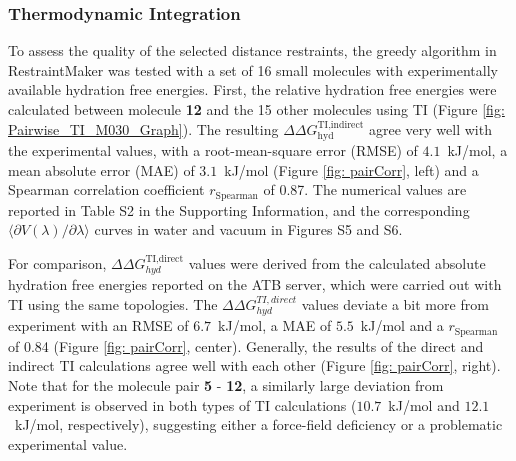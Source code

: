 \subsubsection{Thermodynamic Integration}
To assess the quality of the selected distance restraints, the greedy algorithm in RestraintMaker was tested with a set of 16 small molecules with experimentally available hydration free energies. First, the relative hydration free energies were calculated between molecule \textbf{12} and the 15 other molecules using TI (Figure \ref{fig: Pairwise_TI_M030_Graph}). 
The resulting $\Delta \Delta G_\text{hyd}^\text{TI,indirect}$ agree very well with the experimental values,\cite{Wolfenden1987,Rizzo2006,Nicholls2008,Guthrie2009,Guthrie2014,Mobley2014} with a root-mean-square error (RMSE) of $4.1$~kJ/mol, a mean absolute error (MAE) of $3.1$~kJ/mol (Figure \ref{fig: pairCorr}, left) and a Spearman correlation coefficient $r_{\text{Spearman}}$ of 0.87.
The numerical values are reported in Table S2 in the Supporting Information, %
and the corresponding $\langle \partial V(\lambda)/\partial\lambda \rangle$ curves in water and vacuum in Figures S5 and S6. %

For comparison, $\Delta \Delta G_{hyd}^\text{TI,direct}$ values were derived from the calculated absolute hydration free energies reported on the ATB server,\cite{Stroet2018} which were carried out with TI using the same topologies. The $\Delta \Delta G_{hyd}^{TI,direct}$ values deviate a bit more from experiment with an RMSE of $6.7$~kJ/mol, a MAE of $5.5$~kJ/mol and a $r_{\text{Spearman}}$ of 0.84 (Figure \ref{fig: pairCorr}, center).
Generally, the results of the direct\cite{Stroet2018} and indirect TI calculations agree well with each other (Figure \ref{fig: pairCorr}, right). Note that for the molecule pair \textbf{5} - \textbf{12}, a similarly large deviation from experiment is observed in both types of TI calculations ($10.7$~kJ/mol and $12.1$~kJ/mol, respectively), suggesting either a force-field deficiency or a problematic experimental value.

